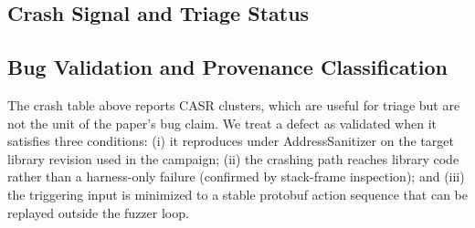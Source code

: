 

\subsection{Crash Signal and Triage Status}
\label{sec:eval_crashes}

\begin{table}[htb]
\centering
\caption{CASR-triaged crash clusters by bug class (Memory, Null/Ptr, Resource, Logic).}
\label{tab:crash_quality}
\end{table}

\subsection{Bug Validation and Provenance Classification}
\label{sec:eval_bug_validation}

The crash table above reports CASR clusters, which are useful for triage
but are not the unit of the paper's bug claim.  We treat a defect as
validated when it satisfies three conditions: (i) it reproduces under
AddressSanitizer on the target library revision used in the campaign;
(ii) the crashing path reaches library code rather than a harness-only
failure (confirmed by stack-frame inspection); and (iii) the triggering
input is minimized to a stable protobuf action sequence that can be
replayed outside the fuzzer loop.

